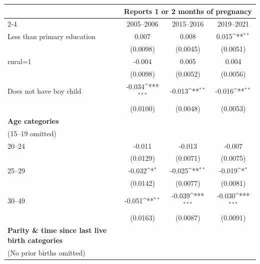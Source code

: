 {
\def\sym#1{\ifmmode^{#1}\else\(^{#1}\)\fi}
\begin{tabular}{l*{3}{c}}
\toprule
                    &\multicolumn{3}{c}{Reports 1 or 2 months of pregnancy}           \\\cmidrule(lr){2-4}
                    &\multicolumn{1}{c}{2005--2006}&\multicolumn{1}{c}{2015--2016}&\multicolumn{1}{c}{2019--2021}\\
\midrule
\hspace*{1em}Less than primary education&       0.007         &       0.008         &       0.015\sym{**} \\
                    &    (0.0098)         &    (0.0045)         &    (0.0051)         \\
\addlinespace
rural=1             &      -0.004         &       0.005         &       0.004         \\
                    &    (0.0098)         &    (0.0052)         &    (0.0056)         \\
\addlinespace
\hspace*{1em}Does not have boy child&      -0.034\sym{***}&      -0.013\sym{**} &      -0.016\sym{**} \\
                    &    (0.0100)         &    (0.0048)         &    (0.0053)         \\
\addlinespace
\textbf{Age categories} \\ (15–19 omitted)&                     &                     &                     \\
\addlinespace
\hspace*{1em}20–24               &      -0.011         &      -0.013         &      -0.007         \\
                    &    (0.0129)         &    (0.0071)         &    (0.0075)         \\
\addlinespace
\hspace*{1em}25–29               &      -0.032\sym{*}  &      -0.025\sym{**} &      -0.019\sym{*}  \\
                    &    (0.0142)         &    (0.0077)         &    (0.0081)         \\
\addlinespace
\hspace*{1em}30–49               &      -0.051\sym{**} &      -0.039\sym{***}&      -0.030\sym{***}\\
                    &    (0.0163)         &    (0.0087)         &    (0.0091)         \\
\addlinespace
\textbf{Parity \& time since last live birth categories} \\ (No prior births omitted)&                     &                     &                     \\

\end{tabular}}
